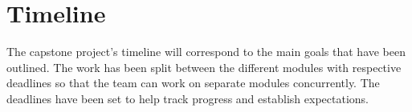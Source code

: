 \documentclass[12pt, titlepage]{article}
\begin{document}





\section{Timeline}

The capstone project's timeline will correspond to the main goals that have been outlined. The work has been split between the different modules with respective deadlines so that the team can work on separate modules concurrently. The deadlines have been set to help track progress and establish expectations. 
\end{document}
